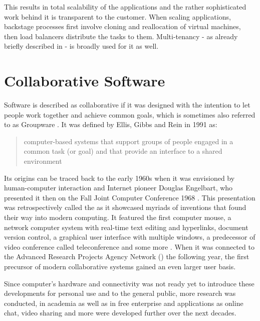 This results in total scalability of the applications and the rather sophisticated work behind it is transparent to the customer. When scaling applications, backstage processes first involve cloning and reallocation of virtual machines, then load balancers distribute the tasks to them. Multi-tenancy - as already briefly described in  - is broadly used for it as well.

\section{Collaborative Software}
\label{sec:collaborative-software}
Software is described as collaborative if it was designed with the intention to let people work together and achieve common goals, which is sometimes also referred to as Groupware \cite{johnson1990rhythms}. It was defined by Ellis, Gibbs and Rein in 1991 as:

\begin{quote}
	computer-based systems that support groups of people engaged in a common task (or goal) and that provide an interface to a shared environment \cite{ellis1991groupware}
\end{quote}

Its origins can be traced back to the early 1960s when it was envisioned by human-computer interaction and Internet pioneer Douglas Engelbart, who presented it then on the Fall Joint Computer Conference 1968 \cite{engelbart1962conceptual} \cite{engelbart1968human}. This presentation was retrospectively called the  as it showcased myriads of inventions that found their way into modern computing. It featured the first computer mouse, a network computer system with real-time text editing and hyperlinks, document version control, a graphical user interface with multiple windows, a predecessor of video conference called teleconference and some more \cite{website:engelbart-1968demo}. When it was connected to the Advanced Research Projects Agency Network () the following year, the first precursor of modern collaborative systems gained an even larger user basis.

Since computer's hardware and connectivity was not ready yet to introduce these developments for personal use and to the general public, more research was conducted, in academia as well as in free enterprise and applications as online chat, video sharing and more were developed further over the next decades.

